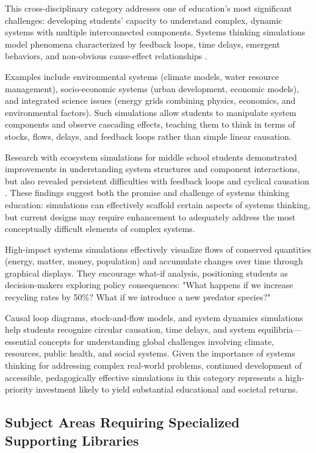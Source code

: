 This cross-disciplinary category addresses one of education's most significant challenges: developing students' capacity to understand complex, dynamic systems with multiple interconnected components. Systems thinking simulations model phenomena characterized by feedback loops, time delays, emergent behaviors, and non-obvious cause-effect relationships \cite{eric2009}.

Examples include environmental systems (climate models, water resource management), socio-economic systems (urban development, economic models), and integrated science issues (energy grids combining physics, economics, and environmental factors). Such simulations allow students to manipulate system components and observe cascading effects, teaching them to think in terms of stocks, flows, delays, and feedback loops rather than simple linear causation.

Research with ecosystem simulations for middle school students demonstrated improvements in understanding system structures and component interactions, but also revealed persistent difficulties with feedback loops and cyclical causation \cite{eric2009}. These findings suggest both the promise and challenge of systems thinking education: simulations can effectively scaffold certain aspects of systems thinking, but current designs may require enhancement to adequately address the most conceptually difficult elements of complex systems.

High-impact systems simulations effectively visualize flows of conserved quantities (energy, matter, money, population) and accumulate changes over time through graphical displays. They encourage what-if analysis, positioning students as decision-makers exploring policy consequences: "What happens if we increase recycling rates by 50\%? What if we introduce a new predator species?"

Causal loop diagrams, stock-and-flow models, and system dynamics simulations help students recognize circular causation, time delays, and system equilibria—essential concepts for understanding global challenges involving climate, resources, public health, and social systems. Given the importance of systems thinking for addressing complex real-world problems, continued development of accessible, pedagogically effective simulations in this category represents a high-priority investment likely to yield substantial educational and societal returns.

\subsection{Subject Areas Requiring Specialized Supporting Libraries}

